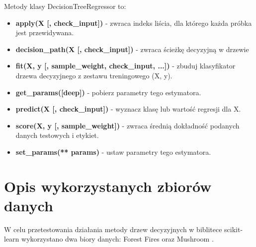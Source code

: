 \documentclass[10pt,a4paper]{article}
\begin{document}
Metody klasy DecisionTreeRegressor to:
\begin{itemize}
	\item \textbf{apply(X [, check\_input])} - zwraca indeks liścia, dla którego każda próbka jest przewidywana.
	\item \textbf{decision\_path(X [, check\_input])} - zwraca ścieżkę decyzyjną w drzewie
	\item \textbf{fit(X, y [, sample\_weight, check\_input, ...])} - zbuduj klasyfikator drzewa decyzyjnego z zestawu treningowego (X, y).
	\item \textbf{get\_params([deep])} - pobierz parametry tego estymatora.
	\item \textbf{predict(X [, check\_input])} - wyznacz klasę lub wartość regresji dla X.
	\item \textbf{score(X, y [, sample\_weight])} - zwraca średnią dokładność podanych danych testowych i etykiet.
	\item \textbf{set\_params(** params)} - ustaw parametry tego estymatora.
\end{itemize}

\section{Opis wykorzystanych zbiorów danych}
W celu przetestowania działania metody drzew decyzyjnych w biblitece scikit-learn wykorzystano dwa biory danych: Forest Fires\cite{ForestFiresDS} oraz Mushroom \cite{MushroomDS}.
\end{document}
